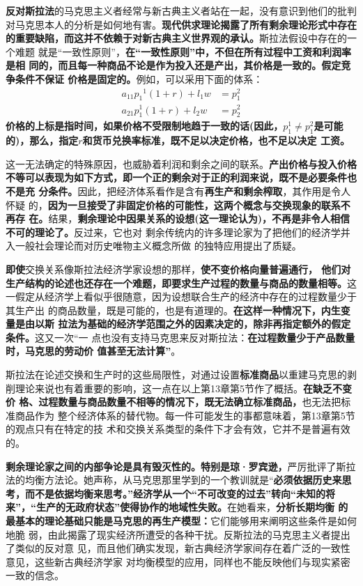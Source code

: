 \textbf{反对斯拉法}的马克思主义者经常与新古典主义者站在一起，没有意识到他们的批判
对马克思本人的分析是如何地有害。\textbf{现代供求理论揭露了所有剩余理论形式中存在
  的重要缺陷，而这并不依赖于对新古典主义世界观的承认。}斯拉法假设中存在的一个难题
就是“一致性原则”，\textbf{在“一致性原则”中，不但在所有过程中工资和利润率是相
  同的，而且每一种商品不论是作为投入还是产出，其价格是一致的。假定竞争条件不保证
  价格是固定的。}例如，可以采用下面的体系：
\begin{align*}
  a_{11}{p_1}^1(1+r) + l_1w  &= p_1^2 \\
  a_{21}p_1^1(1+r)  +l_2w &= p_2^2
\end{align*}
\textbf{价格的上标是指时间，如果价格不受限制地趋于一致的话(因此，$p_{1}^1 \neq
  p_1^2$是可能的)，那么，指定$r$和货币兑换率标准，既不足以决定价格，也不足以决定
  工资。}

这一无法确定的特殊原因，也威胁着利润和剩余之间的联系。\textbf{产出价格与投入价格
  不等可以表现为如下方式，即一个正的剩余对于正的利润来说，既不是必要条件也不是充
  分条件。}因此，把经济体系看作是含有\textbf{再生产和剩余榨取}，其作用是令人怀疑
的，\textbf{因为一旦接受了非固定价格的可能性，这两个概念与交换现象的联系不再存
  在。}结果，\textbf{剩余理论中因果关系的设想(这一理论认为)，不再是非令人相信不可的理论了。}反过来，它也对
剩余传统内的许多理论家为了把他们的经济学并入一般社会理论而对历史唯物主义概念所做
的独特应用提出了质疑。

\textbf{即使}交换关系像斯拉法经济学家设想的那样，\textbf{使不变价格向量普遍通行，
  他们对生产结构的论述也还存在一个难题，即要求生产过程的数量与商品的数量相等。}这
一假定从经济学上看似乎很随意，因为设想联合生产的经济中存在的过程数量少于其生产出
的商品数量，既是可能的，也是有道理的。\textbf{在这样一种情况下，内生变量是由以斯
  拉法为基础的经济学范围之外的因素决定的，除非再指定额外的假定条件。}这又一次“一
点也没有支持马克思来反对斯拉法：\textbf{在过程数量少于产品数量时，马克思的劳动价
  值甚至无法计算”}。

斯拉法在论述交换和生产时的这些局限性，对通过设置\textbf{标准商品}以重建马克思的剥
削理论来说也有着重要的影响，这一点在以上第13章第5节作了概括。\textbf{在缺乏不变价
  格、过程数量与商品数量不相等的情况下，既无法确立标准商品，}也无法把标准商品作为
整个经济体系的替代物。每一件可能发生的事都意味着，第13章第5节的观点只有在特定的技
术和交换关系类型的条件下才会有效，它并不是普遍有效的。

\textbf{剩余理论家之间的内部争论是具有毁灭性的。特别是琼·罗宾逊，}严厉批评了斯拉
法的均衡方法论。她声称，从马克思那里学到的一个教训就是“\textbf{必须依据历史来思
  考，而不是依据均衡来思考。”经济学从一个“不可改变的过去”转向“未知的将
  来”，“生产的无政府状态”使得协作的地域性失败。}在她看来，\textbf{分析长期均衡
  的最基本的理论基础只能是马克思的再生产模型：}它们能够用来阐明这些条件是如何地脆
弱，由此揭露了现实经济所遭受的各种干扰。反斯拉法的马克思主义者提出了类似的反对意
见，而且他们确实发现，新古典经济学家间存在着广泛的一致性意见，这些新古典经济学家
对均衡模型的应用，同样也不能反映他们与现实紧密一致的信念。

